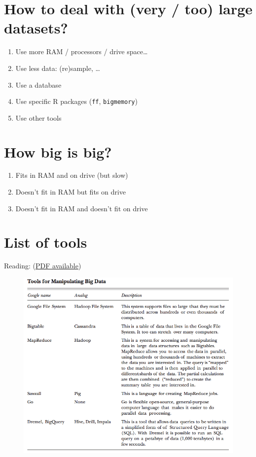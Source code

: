 \documentclass[]{book}
\providecommand{\tightlist}{%
  \setlength{\itemsep}{0pt}\setlength{\parskip}{0pt}}
\theoremstyle{definition}
\theoremstyle{definition}
\theoremstyle{definition}
\theoremstyle{remark}
\begin{document}
\section{How to deal with (very / too) large
datasets?}\label{how-to-deal-with-very-too-large-datasets}

\begin{enumerate}
\def\labelenumi{\arabic{enumi}.}
\tightlist
\item
  Use more RAM / processors / drive space\ldots{}
\item
  Use less data: (re)sample, \ldots{}
\item
  Use a database
\item
  Use specific R packages (\texttt{ff}, \texttt{bigmemory})
\item
  Use other tools
\end{enumerate}

\section{How big is big?}\label{how-big-is-big}

\begin{enumerate}
\def\labelenumi{\arabic{enumi}.}
\tightlist
\item
  Fits in RAM and on drive (but slow)
\item
  Doesn't fit in RAM but fits on drive
\item
  Doesn't fit in RAM and doesn't fit on drive
\end{enumerate}

\section{List of tools}\label{list-of-tools}

Reading: \citet{Varian2014}
(\href{http://pubs.aeaweb.org/doi/pdfplus/10.1257/jep.28.2.3}{PDF
available})

\begin{figure}

{\centering \includegraphics[width=10.39in]{images/ch6_tool_list} 

}

\end{figure}
\end{document}
